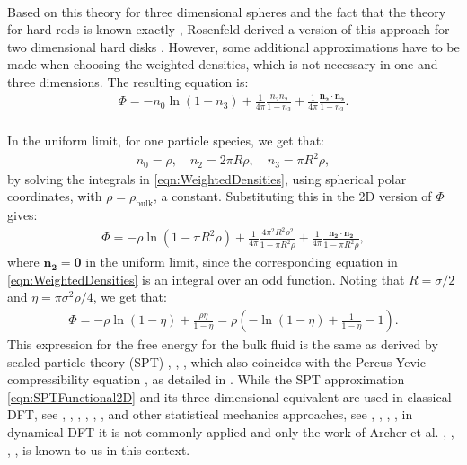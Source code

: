 \\
Based on this theory for three dimensional spheres and the fact that the theory for hard rods is known exactly \cite{Percus1976}, Rosenfeld derived a version of this approach for two dimensional hard disks \cite{Rosenfeld2DInterp}. However, some additional approximations have to be made when choosing the weighted densities, which is not necessary in one and three dimensions. The resulting equation is:
\begin{align*}
	\Phi = - n_0 \ln(1-n_3) + \frac{1}{4 \pi} \frac{n_2 n_2}{1-n_3} + \frac{1}{4 \pi} \frac{\mathbf{n_2} \cdot \mathbf{n_2}}{1-n_3}.
\end{align*}
\\
In the uniform limit, for one particle species, we get that:
\begin{align*}
	n_0 = \rho, \quad n_2 = 2 \pi R \rho, \quad n_3 = \pi R^2 \rho,
\end{align*}
by solving the integrals in \eqref{eqn:WeightedDensities}, using spherical polar coordinates, with $\rho = \rho_{\text{bulk}}$, a constant. 
Substituting this in the 2D version of $\Phi$ gives:
\begin{align*}
	\Phi = - \rho \ln (1- \pi R^2 \rho) + \frac{1}{4 \pi} \frac{4\pi^2 R^2 \rho^2}{1 - \pi R^2 \rho} + \frac{1}{4 \pi}\frac{\mathbf{n_2} \cdot \mathbf{n_2}}{1 - \pi R^2 \rho},
\end{align*}
where $\mathbf{n_2} = \mathbf 0$ in the uniform limit, since the corresponding equation in \eqref{eqn:WeightedDensities} is an integral over an odd function.
Noting that $R = \sigma/2$ and $\eta = \pi \sigma^2 \rho /4$, we get that:
\begin{align} \label{eqn:SPTFunctional2D}
	\Phi = - \rho \ln (1- \eta) + \frac{\rho \eta}{1 - \eta} = \rho \left(-\ln(1-\eta) + \frac{1}{1- \eta} -1 \right).
\end{align} 
This expression for the free energy for the bulk fluid is the same as derived by scaled particle theory (SPT) \cite{Reiss1959}, \cite{Reiss1960}, \cite{Helfand1961}, which also coincides with the Percus-Yevic compressibility equation \cite{PercusYevick1}, as detailed in \cite{RosenfeldSPT}.
While the SPT approximation \eqref{eqn:SPTFunctional2D} and its three-dimensional equivalent are used in classical DFT, see \cite{DFTWinkelmann2001}, \cite{DFTRoth1}, \cite{DFTRoth2}, \cite{DFTGonzalez1997}, \cite{DFTCuesta2008}, \cite{DFTLoewen2002}, and other statistical mechanics approaches, see \cite{GrafLoewen1999}, \cite{DuBois2002}, \cite{Chamoux1998}, \cite{Chamoux1996}, in dynamical DFT it is not commonly applied and only the work of Archer et al. \cite{ArcherSed1}, \cite{ArcherSed2008}, \cite{ArcherSed2011}, \cite{ArcherSed2013}, is known to us in this context.


